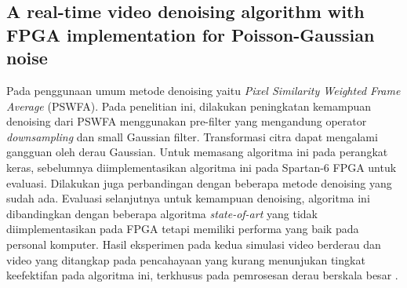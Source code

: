 \subsection{A real-time video denoising algorithm with FPGA implementation for Poisson-Gaussian noise}
Pada penggunaan umum metode denoising yaitu \textit{Pixel Similarity Weighted Frame Average} (PSWFA). Pada penelitian ini, dilakukan peningkatan kemampuan denoising dari PSWFA menggunakan pre-filter yang mengandung operator \textit{downsampling} dan small Gaussian filter. Transformasi citra dapat mengalami gangguan oleh derau Gaussian. Untuk memasang algoritma ini pada perangkat keras, sebelumnya diimplementasikan algoritma ini pada Spartan-6 FPGA untuk evaluasi. Dilakukan juga perbandingan dengan beberapa metode denoising yang sudah ada. Evaluasi selanjutnya untuk kemampuan denoising, algoritma ini dibandingkan dengan beberapa algoritma \textit{state-of-art} yang tidak diimplementasikan pada FPGA tetapi memiliki performa yang baik pada personal komputer. Hasil eksperimen pada kedua simulasi video berderau dan video yang ditangkap pada pencahayaan yang kurang menunjukan tingkat keefektifan pada algoritma ini, terkhusus pada pemrosesan derau berskala besar .
